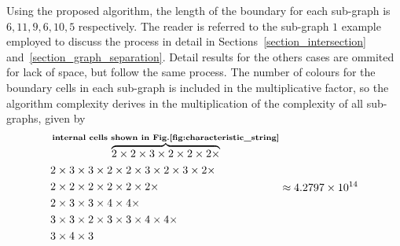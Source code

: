 \documentclass[journal]{IEEEtran}
\begin{document}
Using the proposed algorithm, the length of the boundary for each sub-graph is $6, 11, 9, 6, 10, 5$ respectively. The reader is referred to the sub-graph $1$ example
employed to discuss the process in detail in Sections~\ref{section_intersection} and~\ref{section_graph_separation}. Detail results for the others cases are ommited for lack of space, 
but follow the same process. 
The number of colours for the boundary cells in each sub-graph is included in the multiplicative factor, so the algorithm complexity derives in the multiplication of 
the complexity of all sub-graphs, given by 
\begin{equation}
\begin{aligned}
&\overbrace{2\times2\times3\times2\times2\times2\times}^{\textbf{internal cells shown in Fig.\ref{fig:characteristic_string}}}\\
&2\times3\times3\times2\times2\times3\times2\times3\times2\times\\
&2\times2\times2\times2\times2\times2\times\\
&2\times3\times3\times4\times4\times\\
&3\times3\times2\times3\times3\times4\times4\times\\
&3\times4\times3
\end{aligned} \approx 4.2797\times10^{14}
\end{equation}
\end{document}
